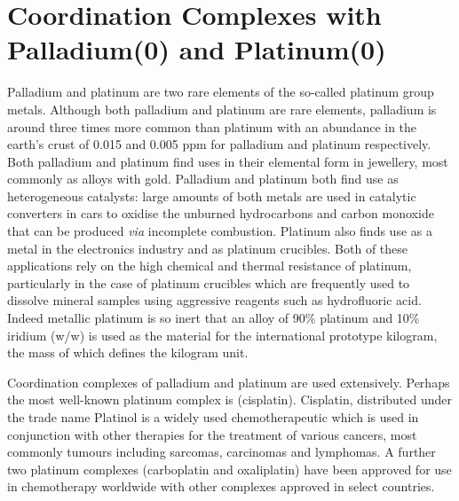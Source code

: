 
\chapter{Coordination Complexes with Palladium(0) and Platinum(0)}
\label{ch:platinum0}

Palladium and platinum are two rare elements of the so-called platinum group metals.  Although both palladium and platinum are rare elements, palladium is around three times more common than platinum with an abundance in the earth's crust of 0.015 and 0.005 ppm for palladium and platinum respectively.  Both palladium and platinum find uses in their elemental form in jewellery, most commonly as alloys with gold.  Palladium and platinum both find use as heterogeneous catalysts: large amounts of both metals are used in catalytic converters in cars to oxidise the unburned hydrocarbons and carbon monoxide that can be produced \emph{via} incomplete combustion.  Platinum also finds use as a metal in the electronics industry and as platinum crucibles.  Both of these applications rely on the high chemical and thermal resistance of platinum, particularly in the case of platinum crucibles which are frequently used to dissolve mineral samples using aggressive reagents such as hydrofluoric acid.  Indeed metallic platinum is so inert that an alloy of 90\%{} platinum and 10\%{} iridium (w/w) is used as the material for the international prototype kilogram, the mass of which defines the kilogram unit.  


Coordination complexes of palladium and platinum are used extensively.  Perhaps the most well-known platinum complex is \ce{[Pt(NH3)2Cl2]} (cisplatin).  Cisplatin, distributed under the trade name Platinol is a widely used chemotherapeutic which is used in conjunction with other therapies for the treatment of various cancers, most commonly tumours including sarcomas, carcinomas and lymphomas.  A further two platinum complexes (carboplatin and oxaliplatin) have been approved for use in chemotherapy worldwide with other complexes approved in select countries.\cite{Wilson2013}

